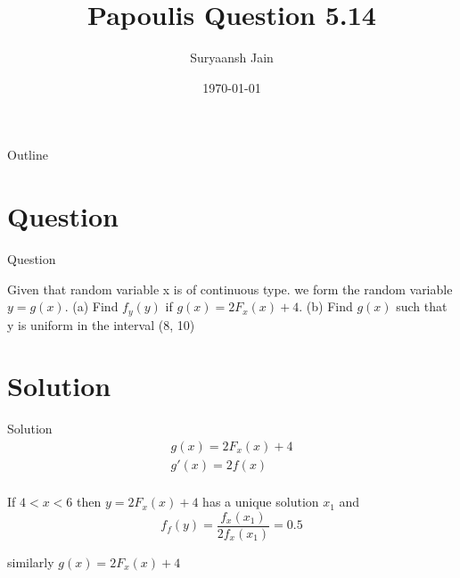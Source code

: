 \documentclass{beamer}
\title{Papoulis Question 5.14}
\author{Suryaansh Jain}
\date{\today}
\begin{document}
\begin{frame}
    \titlepage 
\end{frame}

\logo{}


\begin{frame}{Outline}
    \tableofcontents
\end{frame}


\section{Question}
\begin{frame}{Question}

Given that random variable x is of continuous type. we form the random variable $y = g(x)$.
(a) Find $f_y(y)$ if $g(x) = 2F_x(x) +4$. (b) Find $g(x)$ such that y is uniform in the interval
(8, 10)
\end{frame}


\section{Solution}
\begin{frame}{Solution}
\begin{align}
    g(x) = 2F_x(x) + 4 \\ 
    g'(x) = 2f(x) \\
\end{align}

If $4 < x < 6$ then $y = 2F_x(x) + 4$ has a unique solution $x_1$ and 
\begin{equation}
    f_f(y) = \frac{f_x(x_1)}{2f_x(x_1)} = 0.5
\end{equation}

similarly $g(x) = 2F_x(x) + 4$
\end{frame} 
\end{document}
